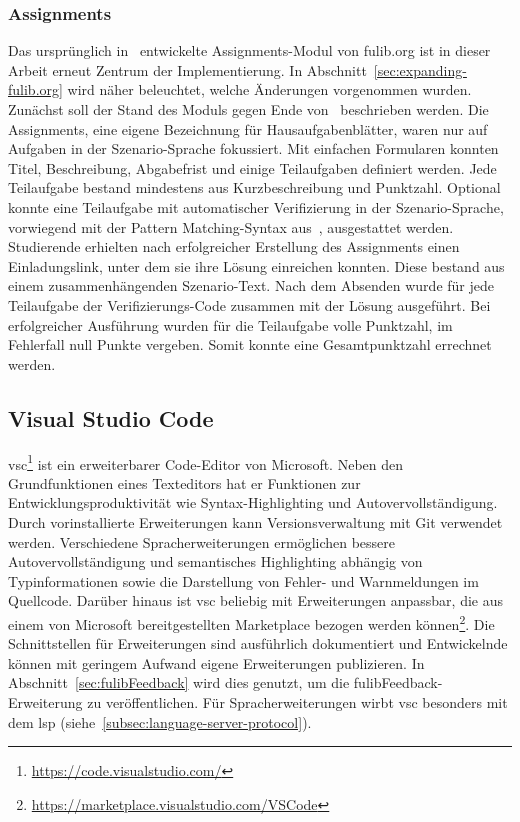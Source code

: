 \subsubsection{Assignments}
Das ursprünglich in~\cite{bachelor-thesis} entwickelte Assignments-Modul von fulib.org ist in dieser Arbeit erneut Zentrum der Implementierung.
In Abschnitt~\ref{sec:expanding-fulib.org} wird näher beleuchtet, welche Änderungen vorgenommen wurden.
Zunächst soll der Stand des Moduls gegen Ende von~\cite{bachelor-thesis} beschrieben werden.
Die Assignments, eine eigene Bezeichnung für Hausaufgabenblätter, waren nur auf Aufgaben in der Szenario-Sprache fokussiert.
Mit einfachen Formularen konnten Titel, Beschreibung, Abgabefrist und einige Teilaufgaben definiert werden.
Jede Teilaufgabe bestand mindestens aus Kurzbeschreibung und Punktzahl.
Optional konnte eine Teilaufgabe mit automatischer Verifizierung in der Szenario-Sprache, vorwiegend mit der Pattern Matching-Syntax aus~\cite{bachelor-thesis}, ausgestattet werden.
Studierende erhielten nach erfolgreicher Erstellung des Assignments einen Einladungslink, unter dem sie ihre Lösung einreichen konnten.
Diese bestand aus einem zusammenhängenden Szenario-Text.
Nach dem Absenden wurde für jede Teilaufgabe der Verifizierungs-Code zusammen mit der Lösung ausgeführt.
Bei erfolgreicher Ausführung wurden für die Teilaufgabe volle Punktzahl, im Fehlerfall null Punkte vergeben.
Somit konnte eine Gesamtpunktzahl errechnet werden.

\subsection{Visual Studio Code}\label{subsec:visual-studio-code}

\ac{vsc}\footnote{\url{https://code.visualstudio.com/}} ist ein erweiterbarer Code-Editor von Microsoft.
Neben den Grundfunktionen eines Texteditors hat er Funktionen zur Entwicklungsproduktivität wie Syntax-Highlighting und Autovervollständigung.
Durch vorinstallierte Erweiterungen kann Versionsverwaltung mit Git verwendet werden.
Verschiedene Spracherweiterungen ermöglichen bessere Autovervollständigung und semantisches Highlighting abhängig von Typinformationen sowie die Darstellung von Fehler- und Warnmeldungen im Quellcode.
Darüber hinaus ist \ac{vsc} beliebig mit Erweiterungen anpassbar, die aus einem von Microsoft bereitgestellten Marketplace bezogen werden können\footnote{\url{https://marketplace.visualstudio.com/VSCode}}.
Die Schnittstellen für Erweiterungen sind ausführlich dokumentiert und Entwickelnde können mit geringem Aufwand eigene Erweiterungen publizieren.
In Abschnitt~\ref{sec:fulibFeedback} wird dies genutzt, um die fulibFeedback-Erweiterung zu veröffentlichen.
Für Spracherweiterungen wirbt \ac{vsc} besonders mit dem \ac{lsp} (siehe~\ref{subsec:language-server-protocol}).

